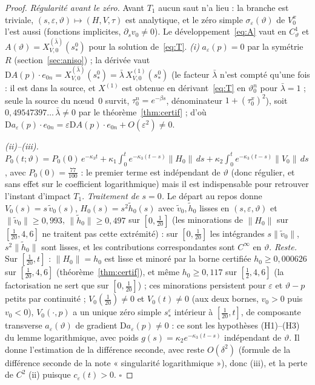 \documentclass[11pt,a4paper]{article}
\theoremstyle{remark}
\newcommand{\vth}{\vartheta}
\newcommand{\D}{\mathrm D}
\begin{document}
\begin{proof}
\emph{Régularité avant le zéro.} Avant $T_1$ aucun saut n'a lieu : la branche est triviale, $(s,\varepsilon,\vth)\mapsto(H,V,\tau)$ est analytique, et le zéro simple $\sigma_\varepsilon(\vth)$ de $V_0^x$ l'est aussi (fonctions implicites, $\partial_sv_0\ne0$). Le développement~\eqref{eq:A} vaut en $C^1_\vth$ et $A(\vth)=X^{(\bar\lambda)}_{V,0}(s_*^0)$ pour la solution de~\eqref{eq:T}. \emph{(i)} $a_\varepsilon(p)=0$ par la symétrie $R$ (section~\ref{sec:aniso}) ; la dérivée vaut $\D A(p)\cdot e_{0n}=X^{(\bar\lambda)}_{V,0}(s_*^0)=\bar\lambda\,X^{(1)}_{V,0}(s_*^0)$ (le facteur $\bar\lambda$ n'est compté qu'une fois : il est dans la source, et $X^{(1)}$ est obtenue en dérivant~\eqref{eq:T} en $\vth^n_0$ pour $\bar\lambda=1$ ; seule la source du nœud~0 survit, $\tau_0^n=e^{-\beta s}$, dénominateur $1+(\tau_0^x)^2$), soit $0{,}49547397\ldots\,\bar\lambda\ne0$ par le théorème~\ref{thm:certif} ; d'où $\D a_\varepsilon(p)\cdot e_{0n}=\varepsilon\D A(p)\cdot e_{0n}+O(\varepsilon^2)\ne0$.

\emph{(ii)--(iii).} $P_0(t;\vth)=P_0(0)\,e^{-\kappa_3t}+\kappa_1\!\int_0^t\!e^{-\kappa_3(t-s)}\lVert H_0\rVert\,ds+\kappa_2\!\int_0^t\!e^{-\kappa_3(t-s)}\lVert V_0\rVert\,ds$, avec $P_0(0)=\frac{77}{100}$ : le premier terme est indépendant de $\vth$ (donc régulier, et sans effet sur le coefficient logarithmique) mais il est indispensable pour retrouver l'instant d'impact $T_1$. \emph{Traitement de $s=0$.} Le départ au repos donne $V_0(s)=s\,\tilde v_0(s)$, $H_0(s)=s^2\tilde h_0(s)$ avec $\tilde v_0,\tilde h_0$ lisses en $(s,\varepsilon,\vth)$ et $\lVert\tilde v_0\rVert\ge0{,}993$, $\lVert\tilde h_0\rVert\ge0{,}497$ sur $[0,\frac1{20}]$ (les minorations de $\lVert H_0\rVert$ sur $[\frac1{20},4{,}6]$ ne traitent pas cette extrémité) : sur $[0,\frac1{20}]$ les intégrandes $s\lVert\tilde v_0\rVert$, $s^2\lVert\tilde h_0\rVert$ sont lisses, et les contributions correspondantes sont $C^\infty$ en $\vth$. \emph{Reste.} Sur $[\frac1{20},t]$ : $\lVert H_0\rVert=h_0$ est lisse et minoré par la borne certifiée $h_0\ge0{,}000626$ sur $[\frac1{20},4{,}6]$ (théorème~\ref{thm:certif}), et même $h_0\ge0{,}117$ sur $[\frac12,4{,}6]$ (la factorisation ne sert que sur $[0,\frac1{20}]$) ; ces minorations persistent pour $\varepsilon$ et $\vth-p$ petits par continuité ; $V_0(\frac1{20})\ne0$ et $V_0(t)\ne0$ (aux deux bornes, $v_0>0$ puis $v_0<0$), $V_0(\cdot,p)$ a un unique zéro simple $s_*^\varepsilon$ intérieur à $[\frac1{20},t]$, de composante transverse $a_\varepsilon(\vth)$ de gradient $\D a_\varepsilon(p)\ne0$ : ce sont les hypothèses (H1)--(H3) du lemme logarithmique, avec poids $g(s)=\kappa_2e^{-\kappa_3(t-s)}$ indépendant de $\vth$. Il donne l'estimation de la différence seconde, avec reste $O(\delta^2)$ (formule de la différence seconde de la note « singularité logarithmique »), donc (iii), et la perte de $C^2$ (ii) puisque $c_\varepsilon(t)>0$. $\square$
\end{proof}
\end{document}
